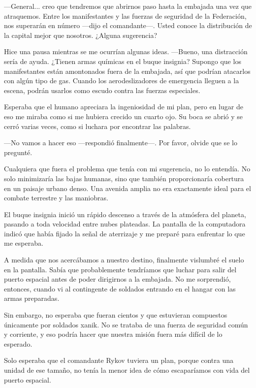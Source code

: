 —General... creo que tendremos que abrirnos paso hasta la embajada una vez que atraquemos. Entre los manifestantes y las fuerzas de seguridad de la Federación, nos superarán en número —dijo el comandante—. Usted conoce la distribución de la capital mejor que nosotros. ¿Alguna sugerencia?

Hice una pausa mientras se me ocurrían algunas ideas. —Bueno, una distracción sería de ayuda. ¿Tienen armas químicas en el buque insignia? Supongo que los manifestantes están amontonados fuera de la embajada, así que podrían atacarlos con algún tipo de gas. Cuando los aerodeslizadores de emergencia lleguen a la escena, podrán usarlos como escudo contra las fuerzas especiales.

Esperaba que el humano apreciara la ingeniosidad de mi plan, pero en lugar de eso me miraba como si me hubiera crecido un cuarto ojo. Su boca se abrió y se cerró varias veces, como si luchara por encontrar las palabras.

—No vamos a hacer eso —respondió finalmente—. Por favor, olvide que se lo pregunté.

Cualquiera que fuera el problema que tenía con mi sugerencia, no lo entendía. No solo minimizaría las bajas humanas, sino que también proporcionaría cobertura en un paisaje urbano denso. Una avenida amplia no era exactamente ideal para el combate terrestre y las maniobras.

El buque insignia inició un rápido descenso a través de la atmósfera del planeta, pasando a toda velocidad entre nubes plateadas. La pantalla de la computadora indicó que había fijado la señal de aterrizaje y me preparé para enfrentar lo que me esperaba.

A medida que nos acercábamos a nuestro destino, finalmente vislumbré el suelo en la pantalla. Sabía que probablemente tendríamos que luchar para salir del puerto espacial antes de poder dirigirnos a la embajada. No me sorprendió, entonces, cuando vi al contingente de soldados entrando en el hangar con las armas preparadas.

Sin embargo, no esperaba que fueran cientos y que estuvieran compuestos únicamente por soldados xanik. No se trataba de una fuerza de seguridad común y corriente, y eso podría hacer que nuestra misión fuera más difícil de lo esperado.

Solo esperaba que el comandante Rykov tuviera un plan, porque contra una unidad de ese tamaño, no tenía la menor idea de cómo escaparíamos con vida del puerto espacial.